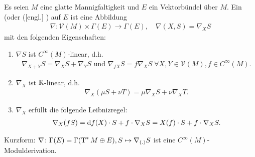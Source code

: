 \begin{Dfn}
  Es seien $M$ eine glatte Mannigfaltigkeit und $E$ ein Vektorbündel über $M$.
  Ein  (oder  ([engl.] ) auf $E$ ist eine Abbildung
  \begin{align*}
    \nabla \colon \mathcal V(M) \times \Gamma(E) \to \Gamma(E), \quad \nabla(X,S) = \nabla_XS
  \end{align*}
  mit den folgenden Eigenschaften:
  \begin{enumerate}[label=(\roman*)]
  \item $\nabla S$ ist $C^{\infty}(M)$-linear, d.h.
    \begin{align*}
      \nabla_{X+Y}S = \nabla_XS+\nabla_YS \text{ und } \nabla_{fX}S = f\nabla_XS \; \forall X,Y \in \mathcal V(M), f \in C^{\infty}(M).
    \end{align*}
  \item $\nabla_X$ ist $\operatorname{\mathbb{R}}$-linear, d.h.
    \begin{align*}
      \nabla_X(\mu S + \nu T) = \mu\nabla_XS + \nu\nabla_XT.
    \end{align*}
  \item $\nabla_X$ erfüllt die folgende Leibnizregel:
    \begin{align*}
      \nabla_X(fS) = \mathrm{d} f(X) \cdot S + f\cdot \nabla_XS = X(f)\cdot S + f \cdot \nabla_XS.
    \end{align*}
  \end{enumerate}
  Kurzform: $\nabla \colon \Gamma(E) = \Gamma(\operatorname{T}^{*}M \oplus E), S \mapsto \nabla_{(.)}S$ ist eine $C^{\infty}(M)$-Modulderivation.
\end{Dfn}

